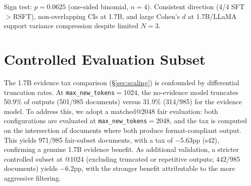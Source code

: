 \begin{table}[t]
\centering
\caption{95\% confidence intervals for training variance ($\chi^2$ method, $N{=}3$ seeds). Compression is the ratio of SFT to RSFT point estimates (unrounded).}
\label{tab:variance_ci}
\small
{}
\vspace{1mm}
{\raggedright\footnotesize Sign test: $p{=}0.0625$ (one-sided binomial, $n{=}4$). Consistent direction (4/4 SFT${>}$RSFT), non-overlapping CIs at 1.7B, and large Cohen's $d$ at 1.7B/LLaMA support variance compression despite limited $N{=}3$.\par}
\end{table}


\section{Controlled Evaluation Subset}
\label{sec:fair_subset}

The 1.7B evidence tax comparison (\S\ref{sec:scaling}) is confounded by differential truncation rates. At \texttt{max\_new\_tokens}$=$1024, the no-evidence model truncates 50.9\% of outputs (501/985 documents) versus 31.9\% (314/985) for the evidence model. To address this, we adopt a matched@2048 fair evaluation: both configurations are evaluated at \texttt{max\_new\_tokens}$=$2048, and the tax is computed on the intersection of documents where both produce format-compliant output. This yields 971/985 fair-subset documents, with a tax of $-$5.63pp (s42), confirming a genuine 1.7B evidence benefit. As additional validation, a stricter controlled subset at @1024 (excluding truncated or repetitive outputs; 442/985 documents) yields $-$6.2pp, with the stronger benefit attributable to the more aggressive filtering.

